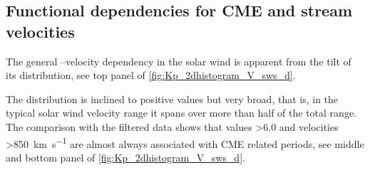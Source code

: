 \subsection{Functional dependencies for CME and stream velocities}
The general \Kp--velocity dependency in the solar wind is apparent from the tilt of its distribution, see top panel of \autoref{fig:Kp_2dhistogram_V_sws_d}.
\begin{figure}[htb]
\end{figure}
The distribution is inclined to positive values but very broad, that is, in the typical solar wind velocity range it spans over more than half of the total \Kp{} range. The comparison with the filtered data shows that \Kp{} values \num{>6.0} and velocities \SI{>850}{\km\per\s} are almost always associated with CME related periods, see middle and bottom panel of \autoref{fig:Kp_2dhistogram_V_sws_d}.


